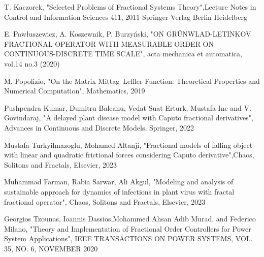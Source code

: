 \documentclass[journal,twoside,web]{ieeecolor}
\begin{document}
\begin{thebibliography}{00}
	T. Kaczorek, "Selected Problems of Fractional Systems Theory",Lecture Notes in Control and Information Sciences 411,  2011 Springer-Verlag Berlin Heidelberg
	
	E. Pawłuszewicz, A. Koszewnik, P. Burzyński, "ON GRÜNWLAD-LETINKOV FRACTIONAL OPERATOR WITH MEASURABLE ORDER ON CONTINUOUS-DISCRETE TIME SCALE", acta mechanica et automatica, vol.14 no.3 (2020)
	
	M. Popolizio, "On the Matrix Mittag–Leffler Function: Theoretical Properties and Numerical Computation", Mathematics, 2019
	
	Pushpendra Kumar, Dumitru Baleanu, Vedat Suat Erturk, Mustafa Inc and V. Govindaraj, "A delayed plant disease model with Caputo fractional derivatives", Advances in Continuous and Discrete Models, Springer, 2022
	
	Mustafa Turkyilmazoglu, Mohamed Altanji, "Fractional models of falling object with linear and quadratic frictional forces considering Caputo derivative",Chaos, Solitons and Fractals, Elsevier, 2023
	
	Muhammad Farman, Rabia Sarwar, Ali Akgul, "Modeling and analysis of sustainable approach for dynamics of infections in plant virus with fractal fractional operator", Chaos, Solitons and Fractals, Elsevier, 2023
	
	Georgios Tzounas, Ioannis Dassios,Mohammed Ahsan Adib Murad, and Federico Milano, "Theory and Implementation of Fractional Order Controllers for Power System Applications", IEEE TRANSACTIONS ON POWER SYSTEMS, VOL. 35, NO. 6, NOVEMBER 2020
\end{thebibliography}
\end{document}
